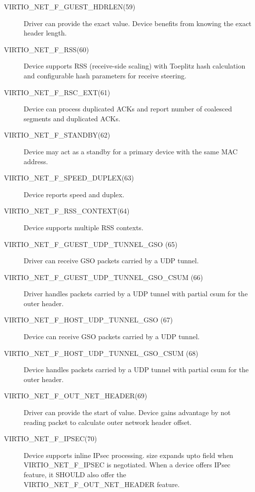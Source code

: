 \begin{description}
\item[VIRTIO_NET_F_GUEST_HDRLEN(59)] Driver can provide the exact 
    value. Device benefits from knowing the exact header length.

\item[VIRTIO_NET_F_RSS(60)] Device supports RSS (receive-side scaling)
    with Toeplitz hash calculation and configurable hash
    parameters for receive steering.

\item[VIRTIO_NET_F_RSC_EXT(61)] Device can process duplicated ACKs
    and report number of coalesced segments and duplicated ACKs.

\item[VIRTIO_NET_F_STANDBY(62)] Device may act as a standby for a primary
    device with the same MAC address.

\item[VIRTIO_NET_F_SPEED_DUPLEX(63)] Device reports speed and duplex.

\item[VIRTIO_NET_F_RSS_CONTEXT(64)] Device supports multiple RSS contexts.

\item[VIRTIO_NET_F_GUEST_UDP_TUNNEL_GSO (65)] Driver can receive GSO packets
  carried by a UDP tunnel.

\item[VIRTIO_NET_F_GUEST_UDP_TUNNEL_GSO_CSUM (66)] Driver handles packets
  carried by a UDP tunnel with partial csum for the outer header.

\item[VIRTIO_NET_F_HOST_UDP_TUNNEL_GSO (67)] Device can receive GSO packets
  carried by a UDP tunnel.

\item[VIRTIO_NET_F_HOST_UDP_TUNNEL_GSO_CSUM (68)] Device handles packets
  carried by a UDP tunnel with partial csum for the outer header.

\item[VIRTIO_NET_F_OUT_NET_HEADER(69)] Driver can provide the start of
  value. Device gains advantage by not reading packet
  to calculate outer network header offset.

\item[VIRTIO_NET_F_IPSEC(70)] Device supports inline IPsec processing.
  size expands upto field 
 when VIRTIO_NET_F_IPSEC is negotiated. When a device offers IPsec feature, it SHOULD
 also offer the VIRTIO_NET_F_OUT_NET_HEADER feature.

\end{description}

